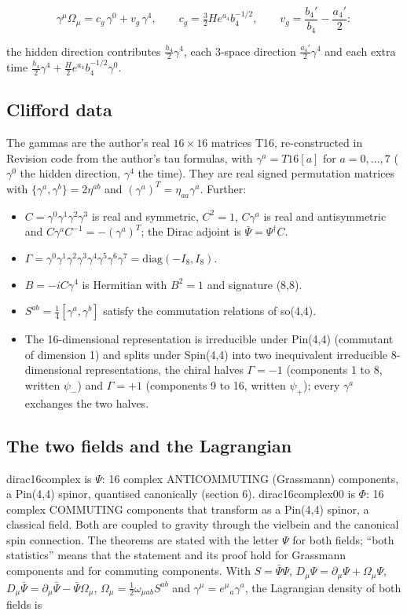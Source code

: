 \documentclass[11pt]{article}
\begin{document}
\[
\gamma^\mu\Omega_\mu = c_g\,\gamma^0 + v_g\,\gamma^4,\qquad c_g = \tfrac32He^{a_4}b_4^{-1/2},\qquad v_g = \frac{b_4'}{b_4} - \frac{a_4'}{2} :
\]

the hidden direction contributes $\frac{h_4}{2}\gamma^4$, each 3-space direction $\frac{a_4'}{2}\gamma^4$ and each extra time $\frac{h_4}{2}\gamma^4 + \frac{H}{2}e^{a_4}b_4^{-1/2}\gamma^0$.

\subsection{Clifford data}

The gammas are the author's real $16 \times 16$ matrices T16, re-constructed in Revision code from the author's tau formulas, with $\gamma^a = T16[a]$ for $a = 0, \dots, 7$ ($\gamma^0$ the hidden direction, $\gamma^4$ the time). They are real signed permutation matrices with $\{\gamma^a,\gamma^b\} = 2\eta^{ab}$ and $(\gamma^a)^T = \eta_{aa}\gamma^a$. Further:

\begin{itemize}
\item $C = \gamma^0\gamma^1\gamma^2\gamma^3$ is real and symmetric, $C^2 = 1$, $C\gamma^a$ is real and antisymmetric and $C\gamma^aC^{-1} = -(\gamma^a)^T$; the Dirac adjoint is $\bar\Psi = \Psi^\dagger C$.
\item $\Gamma = \gamma^0\gamma^1\gamma^2\gamma^3\gamma^4\gamma^5\gamma^6\gamma^7 = \mathrm{diag}(-I_8, I_8)$.
\item $B = -iC\gamma^4$ is Hermitian with $B^2 = 1$ and signature (8,8).
\item $S^{ab} = \frac14[\gamma^a,\gamma^b]$ satisfy the commutation relations of so(4,4).
\item The 16-dimensional representation is irreducible under Pin(4,4) (commutant of dimension 1) and splits under Spin(4,4) into two inequivalent irreducible 8-dimensional representations, the chiral halves $\Gamma = -1$ (components 1 to 8, written $\psi_-$) and $\Gamma = +1$ (components 9 to 16, written $\psi_+$); every $\gamma^a$ exchanges the two halves.
\end{itemize}

\subsection{The two fields and the Lagrangian}

dirac16complex is $\Psi$: 16 complex ANTICOMMUTING (Grassmann) components, a Pin(4,4) spinor, quantised canonically (section 6). dirac16complex00 is $\Phi$: 16 complex COMMUTING components that transform as a Pin(4,4) spinor, a classical field. Both are coupled to gravity through the vielbein and the canonical spin connection. The theorems are stated with the letter $\Psi$ for both fields; ``both statistics'' means that the statement and its proof hold for Grassmann components and for commuting components. With $S = \bar\Psi\Psi$, $D_\mu\Psi = \partial_\mu\Psi + \Omega_\mu\Psi$, $D_\mu\bar\Psi = \partial_\mu\bar\Psi - \bar\Psi\Omega_\mu$, $\Omega_\mu = \frac12\omega_{\mu ab}S^{ab}$ and $\gamma^\mu = e^\mu{}_a\gamma^a$, the Lagrangian density of both fields is
\end{document}
